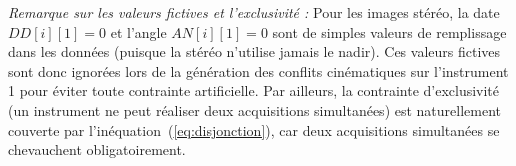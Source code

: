 \noindent\textit{Remarque sur les valeurs fictives et l'exclusivité :}
Pour les images stéréo, la date $DD[i][1]=0$ et l'angle $AN[i][1]=0$ sont de simples valeurs de remplissage dans les données (puisque la stéréo n'utilise jamais le nadir). Ces valeurs fictives sont donc ignorées lors de la génération des conflits cinématiques sur l'instrument 1 pour éviter toute contrainte artificielle. Par ailleurs, la contrainte d'exclusivité (un instrument ne peut réaliser deux acquisitions simultanées) est naturellement couverte par l'inéquation~(\ref{eq:disjonction}), car deux acquisitions simultanées se chevauchent obligatoirement.
